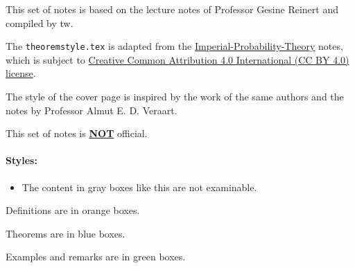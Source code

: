 \thispagestyle{empty}
This set of notes is based on the lecture notes of Professor Gesine Reinert and compiled by tw.  

The \verb|theoremstyle.tex| is adapted from the \href{https://github.com/Samuel-CHLam/Imperial-Probability-Theory}{Imperial-Probability-Theory} notes, which is subject to \href{https://github.com/Samuel-CHLam/Imperial-Probability-Theory#license}{Creative Common Attribution 4.0 International (CC BY 4.0) license}.  

The style of the cover page is inspired by the work of the same authors and the notes by Professor Almut E. D. Veraart.


This set of notes is \underline{\bf NOT} official.

\paragraph{Styles:}
\begin{unexaminable}
\begin{itemize}
    \item The content in gray boxes like this are not examinable.
\end{itemize}
\end{unexaminable}  
 
\begin{definition}
    Definitions are in orange boxes.
\end{definition}
\begin{theorem}
    Theorems are in blue boxes.
\end{theorem}

\begin{example}
    Examples and remarks are in green boxes. 
\end{example}



